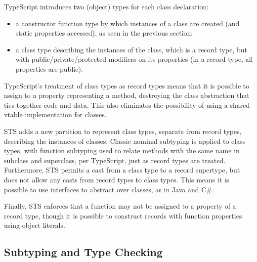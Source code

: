 TypeScript introduces two (object) types for each class declaration:
\begin{itemize}
\item a constructor function type by which instances of a class
are created (and static properties accessed), as seen in the previous section; 
\item a class type describing the instances of the class, which is a record type, but
with public/private/protected modifiers on its properties (in a record type, all properties are public).
\end{itemize}
TypeScript's treatment of class types as record types
means that it is possible to assign to a property representing a method, 
destroying the class abstraction that ties together code and data. This also 
eliminates the possibility of using a shared vtable implementation for classes.

STS adds a new partition to represent class types, separate from record types, describing the instances of classes.
Classic nominal subtyping is applied to class types, with function subtyping used to relate methods with 
the same name in subclass and superclass, per TypeScript, just as record types are treated.
Furthermore, STS permits a cast from a class type
to a record supertype, but does not allow any casts from record types to class types. This means
it is possible to use interfaces to abstract over classes, as in Java and C\#. 

Finally, STS enforces that a function may not be assigned to a property of a record type, 
though it is possible to construct records with function properties using object literals. 

\subsection{Subtyping and Type Checking}

